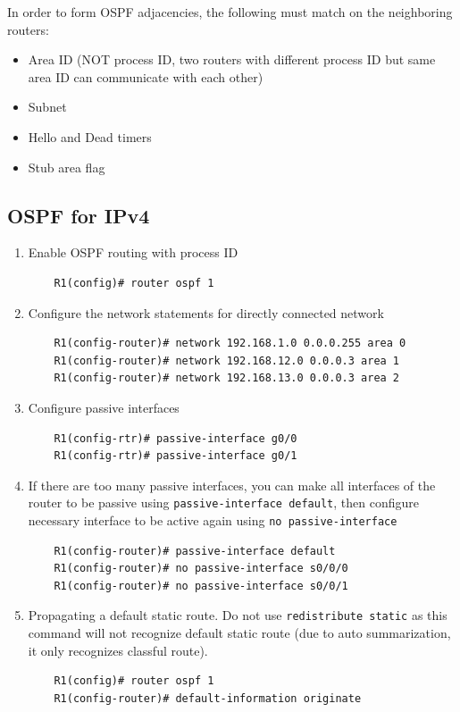 In order to form OSPF adjacencies, the following must match on the neighboring routers:
\begin{itemize}
\item Area ID (NOT process ID, two routers with different process ID but same area ID can communicate with each other)
\item Subnet
\item Hello and Dead timers
\item Stub area flag
\end{itemize}

\subsection{OSPF for IPv4}

\begin{enumerate}
\item Enable OSPF routing with process ID
	\begin{verbatim}
	R1(config)# router ospf 1
	\end{verbatim}
	
\item Configure the network statements for directly connected network
	\begin{verbatim}
	R1(config-router)# network 192.168.1.0 0.0.0.255 area 0 
	R1(config-router)# network 192.168.12.0 0.0.0.3 area 1 
	R1(config-router)# network 192.168.13.0 0.0.0.3 area 2
	\end{verbatim}
	
\item Configure passive interfaces
	\begin{verbatim} 
	R1(config-rtr)# passive-interface g0/0 
	R1(config-rtr)# passive-interface g0/1
	\end{verbatim}	

\item If there are too many passive interfaces, you can make all interfaces of the router to be passive using \verb|passive-interface default|, then configure necessary interface to be active again using \verb|no passive-interface|
	\begin{verbatim}
	R1(config-router)# passive-interface default
	R1(config-router)# no passive-interface s0/0/0
	R1(config-router)# no passive-interface s0/0/1
	\end{verbatim}		
	
\item Propagating a default static route. \note Do not use \verb|redistribute static| as this command will not recognize default static route (due to auto summarization, it only recognizes classful route).
	\begin{verbatim}
	R1(config)# router ospf 1
	R1(config-router)# default-information originate
	\end{verbatim}
	

\end{enumerate}
